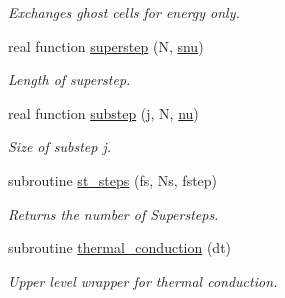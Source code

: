 \begin{DoxyCompactItemize}
\begin{DoxyCompactList}\small\item\em Exchanges ghost cells for energy only. \end{DoxyCompactList}\item 
real function \hyperlink{namespacethermal__cond_a535cc1746914d413d4978aeda7b8fc06}{superstep} (N, \hyperlink{namespacethermal__cond_a53b14d15ce11990f6453a335c81d1728}{snu})
\begin{DoxyCompactList}\small\item\em Length of superstep. \end{DoxyCompactList}\item 
real function \hyperlink{namespacethermal__cond_a782aaba01217281f2aa57dcc955fd294}{substep} (j, N, \hyperlink{namespacethermal__cond_a38896e6bbd3b053ca066e407e4b3817f}{nu})
\begin{DoxyCompactList}\small\item\em Size of substep j. \end{DoxyCompactList}\item 
subroutine \hyperlink{namespacethermal__cond_a4c74dc0fd6a165d0fea419b560943701}{st\+\_\+steps} (fs, Ns, fstep)
\begin{DoxyCompactList}\small\item\em Returns the number of Supersteps. \end{DoxyCompactList}\item 
subroutine \hyperlink{namespacethermal__cond_a685d70692ba68e1ebc0b5d6d8ee8e646}{thermal\+\_\+conduction} (dt)
\begin{DoxyCompactList}\small\item\em Upper level wrapper for thermal conduction. \end{DoxyCompactList}\end{DoxyCompactItemize}
